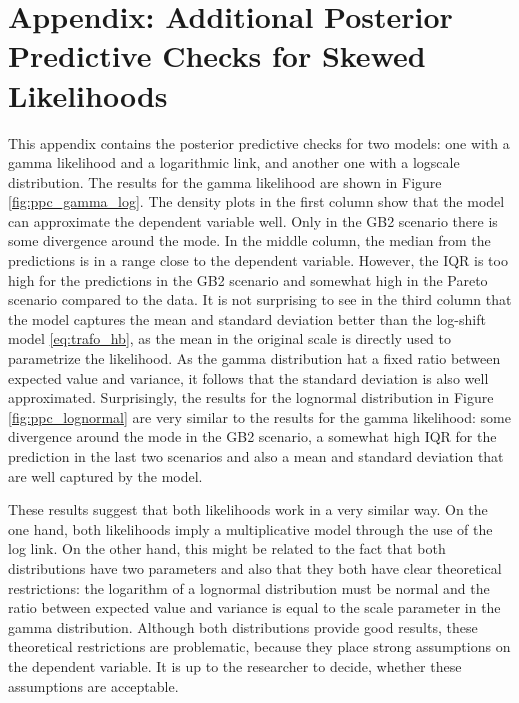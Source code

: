 \chapter{Appendix: Additional Posterior Predictive Checks for Skewed Likelihoods}
\label{appendix:ppc_skewed}

This appendix contains the posterior predictive checks for two models: one with a gamma likelihood and a logarithmic link, and another one with a logscale distribution.
The results for the gamma likelihood are shown in Figure \ref{fig:ppc_gamma_log}.
The density plots in the first column show that the model can approximate the dependent variable well.
Only in the GB2 scenario there is some divergence around the mode.
In the middle column, the median from the predictions is in a range close to the dependent variable.
However, the IQR is too high for the predictions in the GB2 scenario and somewhat high in the Pareto scenario compared to the data.
It is not surprising to see in the third column that the model captures the mean and standard deviation better than the log-shift model \ref{eq:trafo_hb}, as the mean in the original scale is directly used to parametrize the likelihood.
As the gamma distribution hat a fixed ratio between expected value and variance, it follows that the standard deviation is also well approximated.
Surprisingly, the results for the lognormal distribution in Figure \ref{fig:ppc_lognormal} are very similar to the results for the gamma likelihood: some divergence around the mode in the GB2 scenario, a somewhat high IQR for the prediction in the last two scenarios and also a mean and standard deviation that are well captured by the model.

These results suggest that both likelihoods work in a very similar way.
On the one hand, both likelihoods imply a multiplicative model through the use of the log link.
On the other hand, this might be related to the fact that both distributions have two parameters and also that they both have clear theoretical restrictions: the logarithm of a lognormal distribution must be normal and the ratio between expected value and variance is equal to the scale parameter in the gamma distribution.
Although both distributions provide good results, these theoretical restrictions are problematic, because they place strong assumptions on the dependent variable.
It is up to the researcher to decide, whether these assumptions are acceptable.


